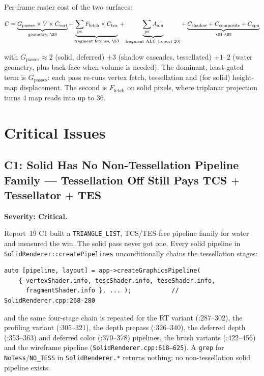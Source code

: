 \documentclass[11pt,a4paper]{article}
\begin{document}
Per-frame raster cost of the two surfaces:

\begin{equation}
C = \underbrace{G_{\mathrm{passes}} \times V \times C_{\mathrm{vert}}}_{\text{geometry, \S3}}
  + \underbrace{\sum_{\mathrm{px}} F_{\mathrm{fetch}} \times C_{\mathrm{tex}}}_{\text{fragment fetches, \S3}}
  + \underbrace{\sum_{\mathrm{px}} A_{\mathrm{alu}}}_{\text{fragment ALU (report~20)}}
  + \underbrace{C_{\mathrm{shadow}} + C_{\mathrm{composite}} + C_{\mathrm{cpu}}}_{\text{\S4--\S5}}
\end{equation}

with $G_{\mathrm{passes}} \approx 2$ (solid, deferred) $+ 3$ (shadow cascades,
tessellated) $+ 1$--$2$ (water geometry, plus back-face when volume is
needed). The dominant, least-gated term is $G_{\mathrm{passes}}$: each pass
re-runs vertex fetch, tessellation and (for solid) height-map displacement.
The second is $F_{\mathrm{fetch}}$ on solid pixels, where triplanar projection
turns 4 map reads into up to 36.

\section{Critical Issues}

\subsection{C1: Solid Has No Non-Tessellation Pipeline Family --- Tessellation Off Still Pays TCS $+$ Tessellator $+$ TES}
\label{sec:c1}

\textbf{Severity: Critical.}

Report~19 C1 built a \texttt{TRIANGLE\_LIST}, TCS/TES-free pipeline family for
water and measured the win. The solid pass never got one. Every solid pipeline
in \texttt{SolidRenderer::createPipelines} unconditionally chains the
tessellation stages:

\begin{lstlisting}[basicstyle=\footnotesize\ttfamily]
auto [pipeline, layout] = app->createGraphicsPipeline(
    { vertexShader.info, tescShader.info, teseShader.info,
      fragmentShader.info }, ... );           // SolidRenderer.cpp:268-280
\end{lstlisting}

and the same four-stage chain is repeated for the RT variant (:287--302), the
profiling variant (:305--321), the depth prepass (:326--340), the deferred
depth (:353--363) and deferred color (:370--378) pipelines, the brush variants
(:422--456) and the wireframe pipeline (\texttt{SolidRenderer.cpp:618--625}).
A \texttt{grep} for \texttt{NoTess}/\texttt{NO\_TESS} in
\texttt{SolidRenderer.*} returns nothing: no non-tessellation solid pipeline
exists.
\end{document}
